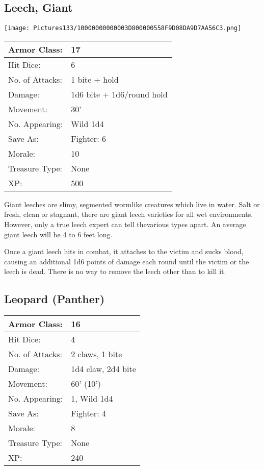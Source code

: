 \documentclass[a4paper,twoside,openany,10pt]{book}
\begin{document}
\begin{multicols}{2}
\subsection*{Leech, Giant}\label{leech-giant}


\begin{center} \texttt{[image: Pictures133/10000000000003D800000558F9D08DA9D7AA56C3.png]} \end{center}

\begin{flushleft}
	\begin{tabularx}{0.50\textwidth}{@{}lX@{}}
Armor Class: & 17 \\\hline
Hit Dice: & 6 \\\hline
No. of Attacks: & 1 bite + hold \\\hline
Damage: & 1d6 bite + 1d6/round hold \\\hline
Movement: & 30' \\\hline
No. Appearing: & Wild 1d4 \\\hline
Save As: & Fighter: 6 \\\hline
Morale: & 10 \\\hline
Treasure Type: & None \\\hline
XP: & 500 \\\hline
\end{tabularx}\medskip
\end{flushleft}

Giant leeches are slimy, segmented wormlike creatures which live in water. Salt or fresh, clean or stagnant, there are giant leech varieties for all wet environments. However, only a true leech expert can tell thevarious types apart. An average giant leech will be 4 to 6 feet long.

Once a giant leech hits in combat, it attaches to the victim and sucks blood, causing an additional 1d6 points of damage each round until the victim or the leech is dead. There is no way to remove the leech other than to kill it.


\subsection*{Leopard (Panther)}\label{leopard-panther}

\begin{tabularx}{0.50\textwidth}{@{}lX@{}}
Armor Class: & 16 \\\hline
Hit Dice: & 4 \\\hline
No. of Attacks: & 2 claws, 1 bite \\\hline
Damage: & 1d4 claw, 2d4 bite \\\hline
Movement: & 60' (10') \\\hline
No. Appearing: & 1, Wild 1d4 \\\hline
Save As: & Fighter: 4 \\\hline
Morale: & 8 \\\hline
Treasure Type: & None \\\hline
XP: & 240 \\\hline
\end{tabularx}\medskip


\end{multicols}
\end{document}
